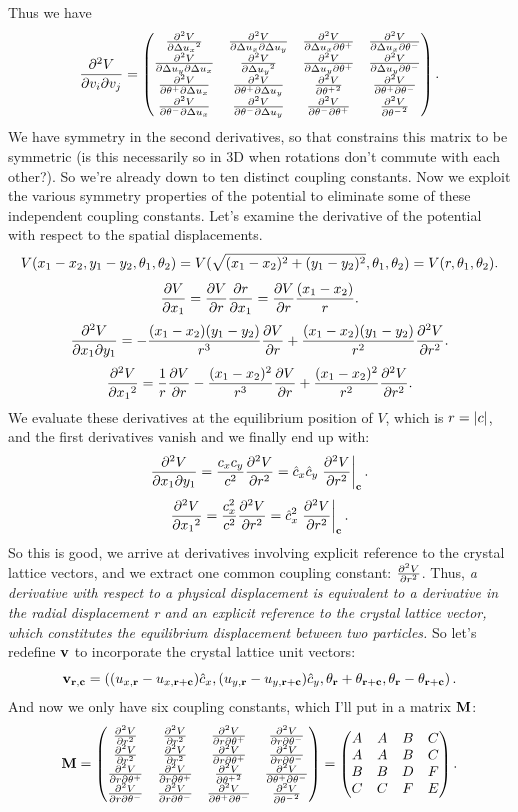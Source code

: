 \documentclass[12pt]{article}
\begin{document}
Thus we have
\[ \frac{\del^2 V}{\del v_i \del v_j} = \pmtrx{\pdert{V}{\D u_x} & \pdder{V}{\D u_x}{\D u_y} & \pdder{V}{\D u_x}{\th^+} & \pdder{V}{\D u_x}{\th^-} \\ \pdder{V}{\D u_y}{\D u_x} & \pdert{V}{\D u_y} & \pdder{V}{\D u_y}{\th^+} & \pdder{V}{\D u_y}{\th^-} \\ \pdder{V}{\th^+}{\D u_x} & \pdder{V}{\th^+}{\D u_y} & \pdert{V}{\th^+} & \pdder{V}{\th^+}{\th^-} \\ \pdder{V}{\th^-}{\D u_x} & \pdder{V}{\th^-}{\D u_y} & \pdder{V}{\th^-}{\th^+} & \pdert{V}{\th^-}}.\]
We have symmetry in the second derivatives, so that constrains this matrix to be symmetric (is this necessarily so in 3D when rotations don't commute with each other?). So we're already down to ten distinct coupling constants. Now we exploit the various symmetry properties of the potential to eliminate some of these independent coupling constants. Let's examine the derivative of the potential with respect to the spatial displacements.
\[ V(x_1-x_2,y_1-y_2,\th_1,\th_2) = V(\sqrt{(x_1-x_2)^2+(y_1-y_2)^2},\th_1,\th_2) = V(r,\th_1,\th_2).\]
\[ \pder{V}{x_1} = \pder{V}{r}\pder{r}{x_1} = \pder{V}{r}\frac{(x_1-x_2)}{r}.\]
\[ \pdder{V}{x_1}{y_1} = -\frac{(x_1-x_2) (y_1-y_2)}{r^3}\pder{V}{r} + \frac{(x_1-x_2)(y_1-y_2)}{r^2} \pdert V r.\]
\[ \pdert{V}{x_1} = \recip{r} \pder V r - \frac{(x_1-x_2)^2}{r^3}\pder V r + \frac{(x_1-x_2)^2}{r^2} \pdert V r.\]
We evaluate these derivatives at the equilibrium position of $V$, which is $r = \abs{c}$, and the first derivatives vanish and we finally end up with:
\[ \pdder{V}{x_1}{y_1} = \frac{c_x c_y}{c^2}\pdert V r = \hat c _x \hat c_y \left. \pdert V r\right |_{\bv c}.\]
\[ \pdert {V }{x_1} = \frac{c_x^2}{c^2} \pdert V r = \hat c_x^2 \left. \pdert V r\right |_{\bv c}.\]
So this is good, we arrive at derivatives involving explicit reference to the crystal lattice vectors, and we extract one common coupling constant: $\pdert V r$. Thus, \emph{ a derivative with respect to a physical displacement is equivalent to a derivative in the radial displacement r and an explicit reference to the crystal lattice vector, which constitutes the equilibrium displacement between two particles.} So let's redefine $\bv v$ to incorporate the crystal lattice unit vectors:
\[ \bv v_{\br,\bv c} = \paren{ (u_{x,\br} - u_{x,\br + \bv c})\hat c_x, (u_{y,\br} - u_{y,\br+\bv c}) \hat c_y, \th_\br + \th_{\br + \bv c},\th_\br - \th_{\br + \bv c}}.\]
And now we only have six coupling constants, which I'll put in a matrix $\bv M$:
\[ \bv M = \pmtrx{\pdert V r & \pdert V r & \pdder{V}{r}{\th^+} &  \pdder{V}{r}{\th^-} \\ \pdert V r & \pdert V r & \pdder{V}{r}{\th^+} & \pdder{V}{r}{\th^-} \\ \pdder{V}{r}{\th^+} & \pdder{V}{r}{\th^+} & \pdert{V}{\th^+} & \pdder{V}{\th^+}{\th^-} \\ \pdder{V}{r}{\th^-} & \pdder{V}{r}{\th^-} & \pdder{V}{\th^+}{\th^-} & \pdert {V}{\th^-}} = \pmtrx{ A & A & B & C \\ A & A & B & C \\ B & B & D & F \\ C & C & F & E}.\]
\end{document}

